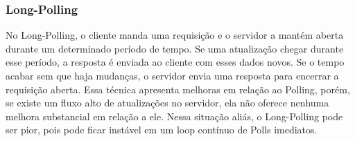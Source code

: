 \documentclass[a4paper,12pt]{article}
\begin{document}
\subsubsection{Long-Polling}

No Long-Polling, o cliente manda uma requisição e o servidor a mantém aberta durante um determinado período de tempo. Se uma atualização chegar durante esse período, a resposta é enviada ao cliente com esses dados novos. Se o tempo acabar sem que haja mudanças, o servidor envia uma resposta para encerrar a requisição aberta. Essa técnica apresenta melhoras em relação ao Polling, porém, se existe um fluxo alto de atualizações no servidor, ela não oferece nenhuma melhora substancial em relação a ele. Nessa situação aliás, o Long-Polling pode ser pior, pois pode ficar instável em um loop contínuo de Polls imediatos.







\end{document}
